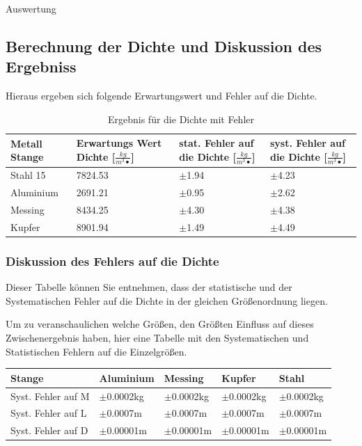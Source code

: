 \documentclass[twoside]{protokoll}
\begin{document}
\begin{aufgabe}{Auswertung}
\subsection{Berechnung der Dichte und Diskussion des Ergebniss}

Hieraus ergeben sich folgende Erwartungswert und Fehler auf die Dichte. 


 \begin{table}[H]
        \centering
        \begin{tabularx}{1\textwidth}{X X X X} %
            \toprule
            \textbf{Metall Stange} & \textbf{Erwartungs Wert Dichte [$\frac{kg}{m^3•}$]} & \textbf{stat. Fehler auf die Dichte [$\frac{kg}{m^3•}$]} & \textbf{syst. Fehler auf die Dichte [$\frac{kg}{m^3•}$]}\\
            \midrule
            Stahl 15 & 7824.53 & $\pm$1.94 & $\pm$4.23 \\
            Aluminium & 2691.21 & $\pm$0.95 & $\pm$2.62 \\
            Messing & 8434.25 & $\pm$4.30 & $\pm$4.38 \\
            Kupfer & 8901.94 & $\pm$1.49 & $\pm$4.49\\
            \bottomrule
        \end{tabularx}
        \label{tab:mytable}
        \caption{Ergebnis für die Dichte mit Fehler}
    \end{table}

\subsubsection{Diskussion des Fehlers auf die Dichte}
Dieser Tabelle können Sie entnehmen, dass der statistische und der Systematischen Fehler auf die Dichte in der gleichen Größenordnung liegen. 

Um zu veranschaulichen welche Größen, den Größten Einfluss auf dieses Zwischenergebnis haben, hier eine Tabelle mit den Systematischen 
und Statistischen Fehlern auf die Einzelgrößen. 

 \begin{table}[H]
        \centering
        \begin{tabularx}{1\textwidth}{l X X X X} %
            \toprule
            \textbf{Stange} & \textbf{Aluminium} & \textbf{Messing} & \textbf{Kupfer} & \textbf{Stahl} \\
            \midrule
            Syst. Fehler auf M & $\pm$0.0002kg & $\pm$0.0002kg & $\pm$0.0002kg & $\pm$0.0002kg \\
            Syst. Fehler auf L & $\pm$0.0007m & $\pm$0.0007m & $\pm$0.0007m & $\pm$0.0007m \\
            Syst. Fehler auf D & $\pm$0.00001m & $\pm$0.00001m & $\pm$0.00001m & $\pm$0.00001m \\


\end{tabularx}
\end{table}
\end{aufgabe}
\end{document}
